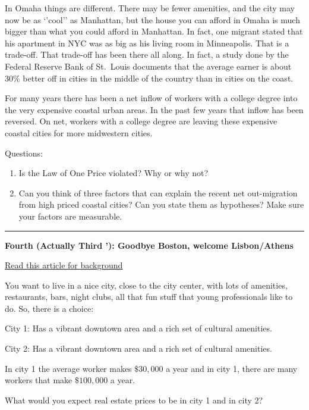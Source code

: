 \documentclass[
]{book}
\begin{document}
In Omaha things are different. There may be fewer amenities, and the city may now be as `'cool'' as Manhattan, but the house you can afford in Omaha is much bigger than what you could afford in Manhattan. In fact, one migrant stated that his apartment in NYC was as big as his living room in Minneapolis. That is a trade-off. That trade-off has been there all along. In fact, a study done by the Federal Reserve Bank of St.~Louis documents that the average earner is about 30\% better off in cities in the middle of the country than in cities on the coast.

For many years there has been a net inflow of workers with a college degree into the very expensive coastal urban areas. In the past few years that inflow has been reversed. On net, workers with a college degree are leaving these expensive coastal cities for more midwestern cities.

Questions:

\begin{enumerate}
\def\labelenumi{\arabic{enumi}.}
\item
  Is the Law of One Price violated? Why or why not?
\item
  Can you think of three factors that can explain the recent net out-migration from high priced coastal cities? Can you state them as hypotheses? Make sure your factors are measurable.
\end{enumerate}

\begin{center}\rule{0.5\linewidth}{0.5pt}\end{center}

\textbf{Fourth (Actually Third '): Goodbye Boston, welcome Lisbon/Athens}

\href{https://www.nytimes.com/2023/03/17/realestate/europe-homes-sale-americans-lisbon-\%20barcelona.html}{Read this article for background}

You want to live in a nice city, close to the city center, with lots of amenities, restaurants, bars, night clubs, all that fun stuff that young professionals like to do. So, there is a choice:

City 1: Has a vibrant downtown area and a rich set of cultural amenities.

City 2: Has a vibrant downtown area and a rich set of cultural amenities.

In city 1 the average worker makes \(\$30,000\) a year and in city 1, there are many workers that make \(\$100,000\) a year.

What would you expect real estate prices to be in city 1 and in city 2?
\end{document}

